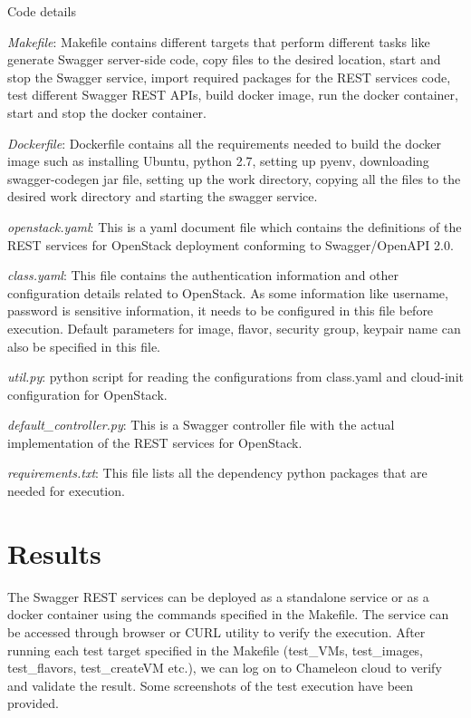 Code details
\begin{description}

\item \textit{Makefile}: Makefile contains different targets that perform
different tasks like generate Swagger server-side code, copy files to the
desired location, start and stop the Swagger service, import required packages
for the REST services code, test different Swagger REST APIs, build docker
image, run the docker container, start and stop the docker container.

\item \textit{Dockerfile}: Dockerfile contains all the requirements needed to
build the docker image such as installing Ubuntu, python 2.7, setting up pyenv,
downloading swagger-codegen jar file, setting up the work directory, copying 
all the files to the desired work directory and starting the swagger service. 

\item \textit{openstack.yaml}: This is a yaml document file which contains the
definitions of the REST services for OpenStack deployment conforming to
Swagger/OpenAPI 2.0.

\item \textit{class.yaml}: This file contains the authentication information 
and other configuration details related to OpenStack. As some information like
username, password is sensitive information, it needs to be
configured in this file before execution. Default parameters for image, flavor,
security group, keypair name can also be specified in this file.

\item \textit{util.py}: python script for reading the configurations from
class.yaml and cloud-init configuration for OpenStack.

\item \textit{default\_controller.py}: This is a Swagger controller file with
the actual implementation of the REST services for OpenStack.

\item \textit{requirements.txt}: This file lists all the dependency python
packages that are needed for execution.
\end{description}

\section{Results}
The Swagger REST services can be deployed as a standalone service or as a 
docker container using the commands specified in the Makefile. The service 
can be accessed through browser or CURL utility to verify the execution. After 
running each test target specified in the Makefile (test\_VMs, test\_images,
test\_flavors, test\_createVM etc.), we can log on to Chameleon cloud to 
verify and validate the result. Some screenshots of the test execution have 
been provided. 

